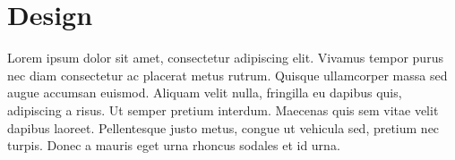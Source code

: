 \chapter{Design}

Lorem ipsum dolor sit amet, consectetur adipiscing elit. Vivamus tempor purus nec diam consectetur ac placerat metus rutrum. Quisque ullamcorper massa sed augue accumsan euismod. Aliquam velit nulla, fringilla eu dapibus quis, adipiscing a risus. Ut semper pretium interdum. Maecenas quis sem vitae velit dapibus laoreet. Pellentesque justo metus, congue ut vehicula sed, pretium nec turpis. Donec a mauris eget urna rhoncus sodales et id urna.






